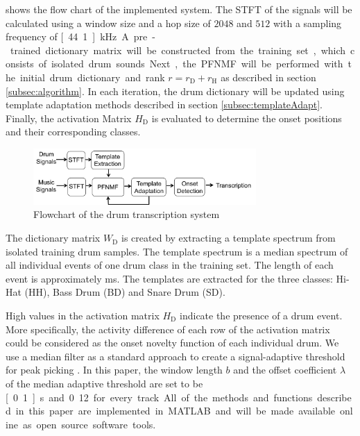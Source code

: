 \documentclass{article}
\begin{document}
 shows the flow chart of the implemented system. The STFT of the signals will be calculated using a window size and a hop size of $2048$ and $512$ with a sampling frequency of \unit[44.1]{kHz}. 
A pre-trained dictionary matrix will be constructed from the training set, which consists of isolated drum sounds. 
Next, the PFNMF will be performed with the initial drum dictionary and rank $r = r_\mathrm{D} + r_\mathrm{H}$ as described in section \ref{subsec:algorithm}. In each iteration, the drum dictionary will be updated using template adaptation methods described in section \ref{subsec:templateAdapt}. Finally, the activation Matrix $H_\mathrm{D}$ is evaluated to determine the onset positions and their corresponding classes.  

\begin{figure}
 \centerline{%
 \includegraphics[width=8.5cm]{flowchart.png}}%
 \caption{Flowchart of the drum transcription system}
 \label{fig:flowchart}
\end{figure}

The dictionary matrix $W_\mathrm{D}$ is created by extracting a template spectrum from isolated training drum samples. The template spectrum is a median spectrum of all individual events of one drum class in the training set. The length of each event  is approximately \unit[80]{ms}. The templates are extracted for the three classes: Hi-Hat (HH), Bass Drum (BD) and Snare Drum (SD).   

High values in the activation matrix $H_\mathrm{D}$ indicate the presence of a drum event. More specifically, the activity difference of each row of the activation matrix could be considered as the onset novelty function of each individual drum. We use a median filter as a standard approach to create a signal-adaptive threshold for peak picking \cite{Lerch2012}. In this paper, the window length $b$ and the offset coefficient $\lambda$ of the median adaptive threshold are set to be \unit[0.1]{s} and 0.12 for every track. All of the methods and functions described in this paper are implemented in MATLAB and will be made available online as open source software tools.
\end{document}
